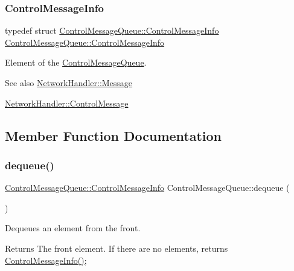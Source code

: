 \subsubsection{\texorpdfstring{Control\+Message\+Info}{ControlMessageInfo}}
{\footnotesize\ttfamily typedef struct \mbox{\hyperlink{structControlMessageQueue_1_1ControlMessageInfo}{Control\+Message\+Queue\+::\+Control\+Message\+Info}}  \mbox{\hyperlink{structControlMessageQueue_1_1ControlMessageInfo}{Control\+Message\+Queue\+::\+Control\+Message\+Info}}}



Element of the \mbox{\hyperlink{classControlMessageQueue}{Control\+Message\+Queue}}. 

\begin{DoxySeeAlso}{See also}
\mbox{\hyperlink{structNetworkHandler_1_1Message}{Network\+Handler\+::\+Message}} 

\mbox{\hyperlink{structNetworkHandler_1_1ControlMessage}{Network\+Handler\+::\+Control\+Message}} 
\end{DoxySeeAlso}


\subsection{Member Function Documentation}
\mbox{\label{classControlMessageQueue_a95142f7602e0a64b38a8f1cb02ef9497}} 
\subsubsection{\texorpdfstring{dequeue()}{dequeue()}}
{\footnotesize\ttfamily \mbox{\hyperlink{structControlMessageQueue_1_1ControlMessageInfo}{Control\+Message\+Queue\+::\+Control\+Message\+Info}} Control\+Message\+Queue\+::dequeue (\begin{DoxyParamCaption}{ }\end{DoxyParamCaption})}



Dequeues an element from the front. 

\begin{DoxyReturn}{Returns}
The front element. If there are no elements, returns \mbox{\hyperlink{classControlMessageQueue_a50df92d449dae01e49fd0e836c7d1f2e}{Control\+Message\+Info()}}; 
\end{DoxyReturn}
\mbox{\label{classControlMessageQueue_a766bed9ca18a663bba82cc32c253049a}} 
